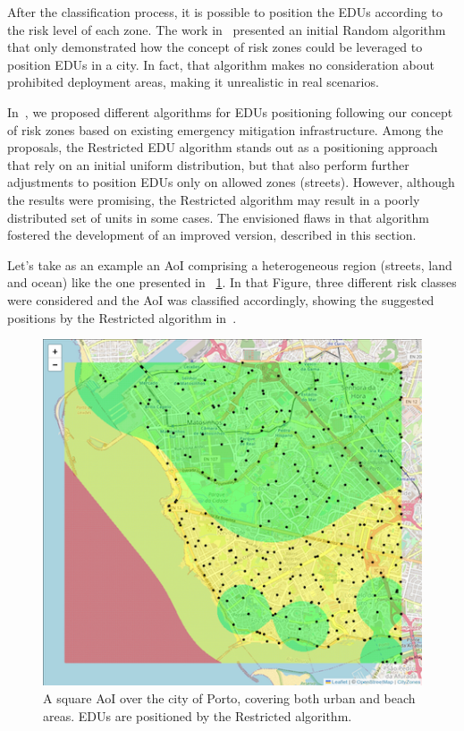 \begin{refsection}
After the classification process, it is possible to position the EDUs according to the risk level of each zone. The work in~\cite{riskzones} presented an initial Random algorithm that only demonstrated how the concept of risk zones could be leveraged to position EDUs in a city. In fact, that algorithm makes no consideration about prohibited deployment areas, making it unrealistic in real scenarios. 

In~\cite{sustainable}, we proposed different algorithms for EDUs positioning following our concept of risk zones based on existing emergency mitigation infrastructure. Among the proposals, the Restricted EDU algorithm stands out as a positioning approach that rely on an initial uniform distribution, but that also perform further adjustments to position EDUs only on allowed zones (streets). However, although the results were promising, the Restricted algorithm may result in a poorly distributed set of units in some cases. The envisioned flaws in that algorithm fostered the development of an improved version, described in this section. 

Let's take as an example an AoI comprising a heterogeneous region (streets, land and ocean) like the one presented in \figurename~\ref{fig:porto_oceano_restricted}. In that Figure, three different risk classes were considered and the AoI was classified accordingly, showing the suggested positions by the Restricted algorithm in~\cite{sustainable}. 

\begin{figure}[!ht]
  \centering
  \includegraphics[width=0.7\linewidth]{Chapters/5-AoM/img/porto_oceano_restricted.png}
  \caption{A square AoI over the city of Porto, covering both urban and beach areas. EDUs are positioned by the Restricted algorithm.}    \label{fig:porto_oceano_restricted}
\end{figure}


\end{refsection}
